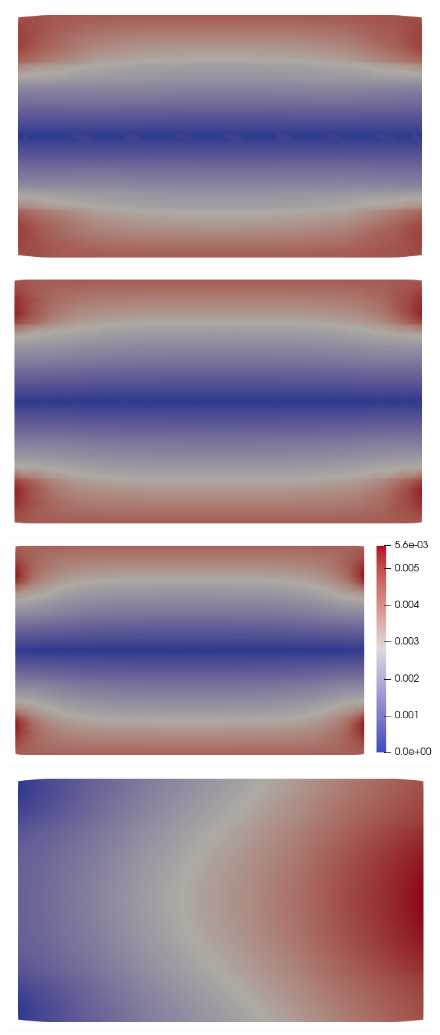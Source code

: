 \documentclass{article}
\begin{document}
\begin{figure}
    \includegraphics[scale=0.27]{slice_B_T-1_lambda-0_8-2-2.png}
    \includegraphics[scale=0.27]{slice_B_T-1_lambda-0_16-3-3.png}
    \includegraphics[scale=0.27]{slice_B_T-1_lambda-0_32-3-4.png}
    \includegraphics[scale=0.27]{slice_ne_T-1_lambda-0_8-2-2.png}

\end{figure}
\end{document}
